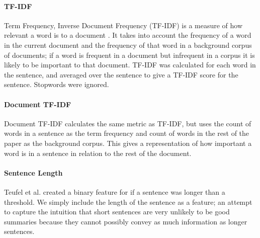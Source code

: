 \documentclass[11pt,a4paper]{article}
\begin{document}
\paragraph{TF-IDF}
Term Frequency, Inverse Document Frequency (TF-IDF) is a measure of how relevant a word is to a document \citep{Ramos2003}. It takes into account the frequency of a word in the current document and the frequency of that word in a background corpus of documents; if a word is frequent in a document but infrequent in a corpus it is likely to be important to that document. TF-IDF was calculated for each word in the sentence, and averaged over the sentence to give a TF-IDF score for the sentence. Stopwords were ignored.

\paragraph{Document TF-IDF}
Document TF-IDF calculates the same metric as TF-IDF, but uses the count of words in a sentence as the term frequency and count of words in the rest of the paper as the background corpus. This gives a representation of how important a word is in a sentence in relation to the rest of the document.

\paragraph{Sentence Length}
Teufel et al. \citeyearpar{Teufel2002} created a binary feature for if a sentence was longer than a threshold. We simply include the length of the sentence as a feature; an attempt to capture the intuition that short sentences are very unlikely to be good summaries because they cannot possibly convey as much information as longer sentences.
\end{document}
